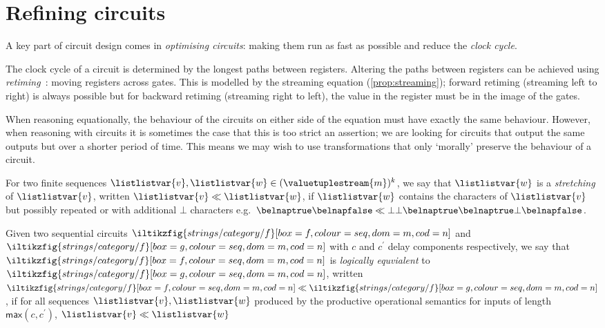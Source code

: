 \section{Refining circuits}

A key part of circuit design comes in \emph{optimising circuits}: making them
run as fast as possible and reduce the \emph{clock cycle}.

\begin{example}[Retiming]
    The clock cycle of a circuit is determined by the longest paths between
    registers. Altering the paths between registers can be achieved using
    \emph{retiming}~\cite{leiserson1991retiming}: moving registers across gates.
    This is modelled by the streaming equation (\cref{prop:streaming});
    forward retiming (streaming left to right) is always possible
    but for backward retiming (streaming right to left), the value
    in the register must be in the image of the gates.
\end{example}

When reasoning equationally, the behaviour of the circuits on either side of the
equation must have exactly the same behaviour.
However, when reasoning with circuits it is sometimes the case that this is too
strict an assertion; we are looking for circuits that output the same outputs
but over a shorter period of time.
This means we may wish to use transformations that only `morally' preserve the
behaviour of a circuit.

\begin{definition}
    For two finite sequences \(
    \listlistvar{v},\listlistvar{w} \in (\valuetuplestream{m})^k
    \), we say that \(\listlistvar{w}\) is a \emph{stretching} of
    \(\listlistvar{v}\), written \(\listlistvar{v} \ll \listlistvar{w}\), if
    \(\listlistvar{w}\) contains the characters of \(\listlistvar{v}\) but
    possibly repeated or with additional \(\bot\) characters e.g.\ \(
    \belnaptrue\belnapfalse
    \ll
    \bot\bot\belnaptrue\belnaptrue\bot\belnapfalse
    \).
\end{definition}

\begin{definition}
    Given two sequential circuits \(
    \iltikzfig{strings/category/f}[box=f,colour=seq,dom=m,cod=n]
    \) and \(
    \iltikzfig{strings/category/f}[box=g,colour=seq,dom=m,cod=n]
    \) with \(c\) and \(c^\prime\) delay components respectively, we say that \(
    \iltikzfig{strings/category/f}[box=f,colour=seq,dom=m,cod=n]
    \) is \emph{logically equvialent} to \(
    \iltikzfig{strings/category/f}[box=g,colour=seq,dom=m,cod=n]
    \), written \(
    \iltikzfig{strings/category/f}[box=f,colour=seq,dom=m,cod=n]
    \ll
    \iltikzfig{strings/category/f}[box=g,colour=seq,dom=m,cod=n]
    \), if for all sequences \(\listlistvar{v},\listlistvar{w}\) produced by the
    productive operational semantics for inputs of length
    \(\mathsf{max}(c,c^\prime)\),  \(\listlistvar{v} \ll \listlistvar{w}\)
\end{definition}

